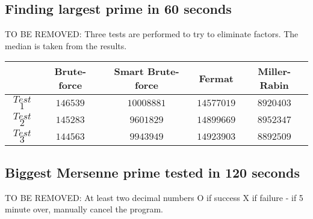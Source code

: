 \documentclass[main.tex]{subfiles}
\begin{document}
\subsection{Finding largest prime in 60 seconds}

TO BE REMOVED: Three tests are performed to try to eliminate factors. The median
is taken from the results.

\begin{table}[ht!]
  \centering
  \begin{tabular}{||c | c c c c||}
    \hline
    & Brute-force & Smart Brute-force & Fermat & Miller-Rabin \\ [0.5ex] 
    \hline\hline
    $Test$ $1$ & $146539$ & $10008881$ & $14577019$ & $8920403$\\ 
    $Test$ $2$ & $145283$ & $9601829$ & $14899669$ & $8952347$\\ 
    $Test$ $3$ & $144563$ & $9943949$ & $14923903$ & $8892509$\\   [1ex] 
    \hline
  \end{tabular}
\end{table}

\subsection{Biggest Mersenne prime tested in 120 seconds}

TO BE REMOVED: At least two decimal numbers O if success X if failure - if 5
minute over, manually cancel the program.
\end{document}
